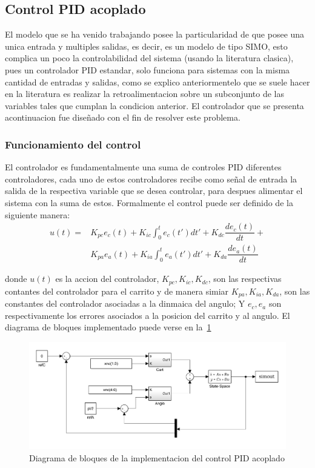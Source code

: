 \subsection{Control PID acoplado}
El modelo que se ha venido trabajando posee la particularidad de que posee una unica entrada
y multiples salidas, es decir, es un modelo de tipo SIMO, esto complica un poco la
controlabilidad del sistema (usando la literatura clasica), pues un controlador PID estandar,
solo funciona para sistemas con la misma cantidad de entradas y salidas, como se explico
anteriormentelo que se suele hacer en la literatura es realizar la retroalimentacion sobre
un subconjunto de las variables tales que cumplan la condicion anterior.
El controlador que se presenta acontinuacion fue diseñado con el fin de resolver este
problema.
\subsubsection{Funcionamiento del control}
El controlador es fundamentalmente una suma de controles PID diferentes controladores,
cada uno de estos controladores recibe como señal de entrada la salida de la respectiva
variable que se desea controlar, para despues alimentar el sistema con la suma de estos.
Formalmente el control puede ser definido de la siguiente manera:
\begin{align*}
  u(t) =& K_{pc}e_c(t) + K_{ic}\int_0^te_c(t')dt' + K_{dc}\dfrac{de_{c}(t)}{dt} + \\
   & K_{pa}e_a(t) + K_{ia}\int_0^te_a(t')dt' + K_{da}\dfrac{de_{a}(t)}{dt}  
\end{align*}

donde $u(t)$ es la accion del controlador, $K_{pc}, K_{ic}, K_{dc}$, son las respectivas
contantes del controlador para el carrito y de manera simiar $K_{pa}, K_{ia}, K_{da}$,
son las constantes del controlador asociadas a la dinmaica del angulo; Y $e_c, e_a$ son
respectivamente los errores asociados a la posicion del carrito y al angulo.
El diagrama de bloques implementado puede verse en la~\ref{fig:controlS}

\begin{figure}[t]
  \label{fig:controlS}
  \includegraphics[scale=0.2]{Figuras/control-modelo.jpg}
  \caption{Diagrama de bloques de la implementacion del control PID acoplado} 
\end{figure}


